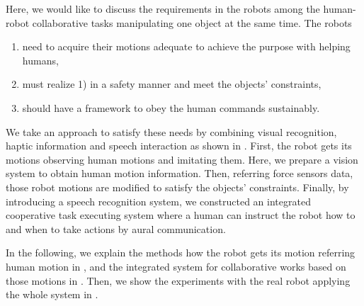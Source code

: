 Here, we would like to discuss the requirements in the robots among the human-robot collaborative tasks manipulating one object at the same time. The robots
\begin{enumerate}
 \item need to acquire their motions adequate to achieve the purpose with helping humans,
 \item must realize 1) in a safety manner and meet the objects' constraints,
 \item should have a framework to obey the human commands sustainably.
\end{enumerate}
We take an approach to satisfy these needs by combining visual recognition, haptic information and speech interaction as shown in . First, the robot gets its motions observing human motions and imitating them. Here, we prepare a vision system to obtain human motion information. Then, referring force sensors data, those robot motions are modified to satisfy the objects' constraints. Finally, by introducing a speech recognition system, we constructed an integrated cooperative task executing system where a human can instruct the robot how to and when to take actions by aural communication.\par
In the following, we explain the methods how the robot gets its motion referring human motion in , and the integrated system for collaborative works based on those motions in . Then, we show the experiments with the real robot applying the whole system in .
